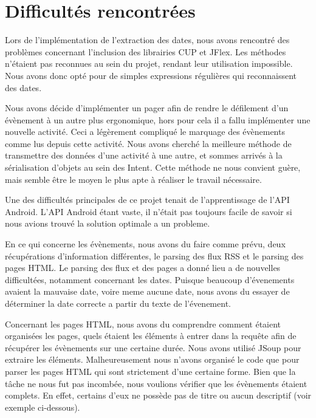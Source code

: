 \chapter{Difficultés rencontrées}

Lors de l’implémentation de l’extraction des dates, nous avons rencontré des problèmes concernant l’inclusion des librairies CUP et JFlex. Les méthodes n’étaient pas reconnues au sein du projet, rendant leur utilisation impossible.
Nous avons donc opté pour de simples expressions régulières qui reconnaissent des dates.

Nous avons décide d’implémenter un pager afin de rendre le défilement d’un évènement à un autre plus ergonomique, hors pour cela il a fallu implémenter une nouvelle activité. Ceci a légèrement compliqué le marquage des évènements comme lus depuis cette activité. Nous avons cherché la meilleure méthode de transmettre des données d’une activité à une autre, et sommes arrivés à la sérialisation d’objets au sein des Intent. Cette méthode ne nous convient guère, mais semble être le moyen le plus apte à réaliser le travail nécessaire.

Une des difficultés principales de ce projet tenait de l’apprentissage de l’API Android. L’API Android étant vaste, il n’était pas toujours facile de savoir si nous avions trouvé la solution optimale a un probleme.


En ce qui concerne les évènements, nous avons du faire comme prévu, deux récupérations d’information différentes, le parsing des flux RSS et le parsing des pages HTML.
Le parsing des flux et des pages a donné lieu a de nouvelles difficultées, notamment concernant les dates. Puisque beaucoup d'évenements avaient la mauvaise date, voire meme aucune date, nous avons du essayer de déterminer la date correcte a partir du texte de l'évenement.


Concernant les pages HTML, nous avons du comprendre comment étaient organisées les pages, quels étaient les éléments à entrer dans la requête afin de récupérer les évènements sur une certaine durée. Nous avons utilisé JSoup pour extraire les éléments. Malheureusement nous n’avons organisé le code que pour parser les pages HTML qui sont strictement d’une certaine forme.
Bien que la tâche ne nous fut pas incombée, nous voulions vérifier que les évènements étaient complets. En effet, certains d’eux ne possède pas de titre ou aucun descriptif (voir exemple ci-dessous).

